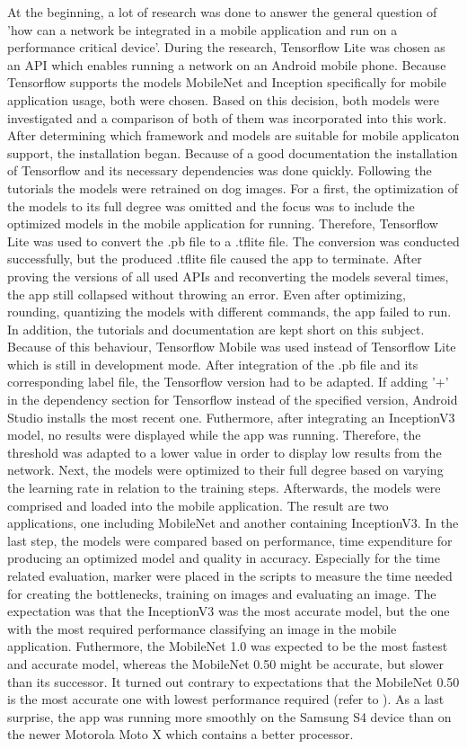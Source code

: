 At the beginning, a lot of research was done to answer the general question of 'how can a network be integrated in a mobile application and run on a performance critical device'. During the research, Tensorflow Lite was chosen as an API which enables running a network on an Android mobile phone. Because Tensorflow supports the models MobileNet and Inception specifically for mobile application usage, both were chosen. Based on this decision, both models were investigated and a comparison of both of them was incorporated into this work. After determining which framework and models are suitable for mobile applicaton support, the installation began. Because of a good documentation the installation of Tensorflow and its necessary dependencies was done quickly. Following the tutorials the models were retrained on dog images. For a first, the optimization of the models to its full degree was omitted and the focus was to include the optimized models in the mobile application for running. Therefore, Tensorflow Lite was used to convert the .pb file to a .tflite file. The conversion was conducted successfully, but the produced .tflite file caused the app to terminate. After proving the versions of all used APIs and reconverting the models several times, the app still collapsed without throwing an error. Even after optimizing, rounding, quantizing the models with different commands, the app failed to run. In addition, the tutorials and documentation are kept short on this subject. Because of this behaviour, Tensorflow Mobile was used instead of Tensorflow Lite which is still in development mode. After integration of the .pb file and its corresponding label file, the Tensorflow version had to be adapted. If adding '+' in the dependency section for Tensorflow instead of the specified version, Android Studio installs the most recent one. Futhermore, after integrating an InceptionV3 model, no results were displayed while the app was running. Therefore, the threshold was adapted to a lower value in order to display low results from the network. Next, the models were optimized to their full degree based on varying the learning rate in relation to the training steps. Afterwards, the models were comprised and loaded into the mobile application. The result are two applications, one including MobileNet and another containing InceptionV3. In the last step, the models were compared based on performance, time expenditure for producing an optimized model and quality in accuracy. Especially for the time related evaluation, marker were placed in the scripts to measure the time needed for creating the bottlenecks, training on images and evaluating an image. The expectation was that the InceptionV3 was the most accurate model, but the one with the most required performance classifying an image in the mobile application. Futhermore, the MobileNet 1.0 was expected to be the most fastest and accurate model, whereas the MobileNet 0.50 might be accurate, but slower than its successor. It turned out contrary to expectations that the MobileNet 0.50 is the most accurate one with lowest performance required (refer to ). As a last surprise, the app was running more smoothly on the Samsung S4 device than on the newer Motorola Moto X which contains a better processor.
